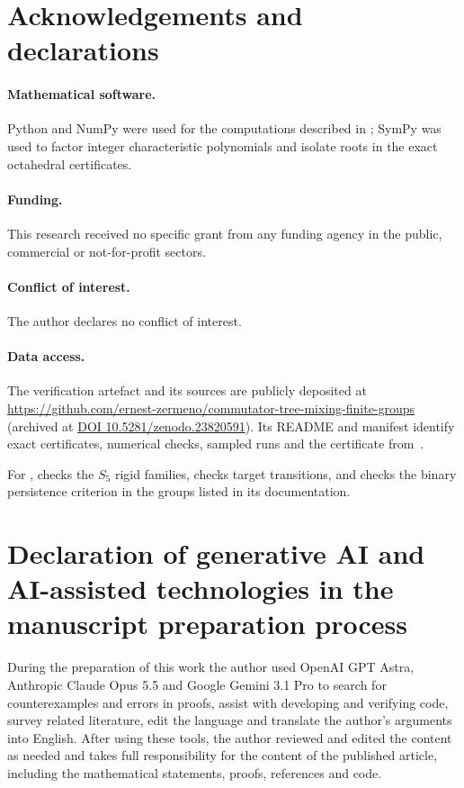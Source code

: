 \documentclass[11pt]{amsart}
\theoremstyle{definition}
\theoremstyle{remark}
\theoremstyle{plain}
\theoremstyle{plain}
\numberwithin{equation}{section}
\begin{document}
\newpage
\section*{Acknowledgements and declarations}
\paragraph{Mathematical software.}
Python and NumPy were used for the computations described in
; SymPy was used to factor integer characteristic
polynomials and isolate roots in the exact octahedral certificates.

\paragraph{Funding.}
This research received no specific grant from any funding agency in the public, commercial or
not-for-profit sectors.

\paragraph{Conflict of interest.}
The author declares no conflict of interest.

\paragraph{Data access.}
The verification artefact and its sources are publicly deposited at
\url{https://github.com/ernest-zermeno/commutator-tree-mixing-finite-groups}
(archived at \href{https://doi.org/10.5281/zenodo.23820591}{DOI 10.5281/zenodo.23820591}).
Its README and manifest identify exact certificates, numerical checks, sampled
runs and the certificate from~\cite{ZermenoS5}.

For , 
checks the $S_5$ rigid families, 
checks target transitions, and 
checks the binary persistence criterion in the groups listed in its documentation.

\section*{Declaration of generative AI and AI-assisted technologies in the manuscript preparation process}
During the preparation of this work the author used OpenAI GPT Astra,
Anthropic Claude Opus 5.5 and Google Gemini 3.1 Pro to search for
counterexamples and errors in proofs, assist with developing and
verifying code, survey related literature, edit the language and
translate the author's arguments into English. After using these tools,
the author reviewed and edited the content as needed and takes full
responsibility for the content of the published article, including the
mathematical statements, proofs, references and code.



\end{document}
